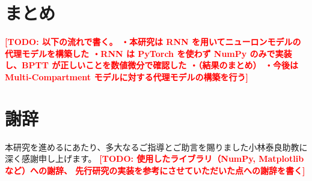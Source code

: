 \documentclass[a4paper,11pt,openany]{ltjsreport}
\newcommand{\TODO}[1]{\textcolor{red}{\textbf{[TODO: #1]}}}
\begin{document}
\chapter{まとめ}

\TODO{以下の流れで書く。
      ・本研究は RNN を用いてニューロンモデルの代理モデルを構築した
      ・RNN は PyTorch を使わず NumPy のみで実装し、BPTT が正しいことを数値微分で確認した
      ・（結果のまとめ）
      ・今後は Multi-Compartment モデルに対する代理モデルの構築を行う}

\chapter*{謝辞}

本研究を進めるにあたり、多大なるご指導とご助言を賜りました小林泰良助教に
深く感謝申し上げます。
\TODO{使用したライブラリ（NumPy, Matplotlib など）への謝辞、
      先行研究の実装を参考にさせていただいた点への謝辞を書く}
\end{document}
